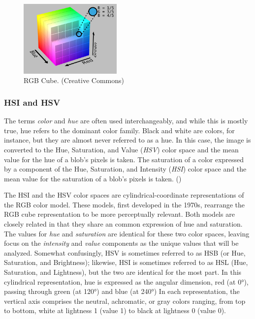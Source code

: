 \documentclass[letterpaper]{report}
\begin{document}
{%
%
\begin{figure}[H]
	\centering
	\includegraphics[width=5cm]{./figures/RGB_Cube_Show_lowgamma_cutout_b.png}
	\caption[RGB Cube]{RGB Cube. (Creative Commons)}
	\label{fig:rgb-cube}
\end{figure}

\subsubsection{HSI and HSV}
The terms {\it color} and {\it hue} are often used interchangeably, and while this is mostly true, hue refers to the dominant color family. Black and white are colors, for instance, but they are almost never referred to as a hue. In this case, the image is converted to the Hue, Saturation, and Value ({\it HSV}) color space and the mean value for the hue of a blob's pixels is taken. The saturation of a color expressed by a component of the Hue, Saturation, and Intensity ({\it HSI}) color space and the mean value for the saturation of a blob's pixels is taken. (\cite{Forsyth2012-hy})

The \gls{HSI} and the \gls{HSV} color spaces are cylindrical-coordinate representations of the RGB color model.  These models, first developed in the 1970s, rearrange the RGB cube representation to be more perceptually relevant. Both models are closely related in that they share an common expression of hue and saturation. The values for \textit{hue} and \textit{saturation} are identical for these two color spaces, leaving focus on the \textit{intensity} and \textit{value} components as the unique values that will be analyzed. \parencite[p.~84]{Forsyth2012-hy} Somewhat confusingly, HSV is sometimes referred to as HSB (or Hue, Saturation, and Brightness); likewise, HSI is sometimes referred to as HSL (Hue, Saturation, and Lightness), but the two are identical for the most part. In this cylindrical representation, hue is expressed as the angular dimension, red (at 0\si{\degree}), passing through green (at 120\si{\degree}) and blue (at 240\si{\degree}) In each representation, the vertical axis comprises the neutral, achromatic, or gray colors ranging, from top to bottom, white at lightness 1 (value 1) to black at lightness 0 (value 0).

}
\end{document}
